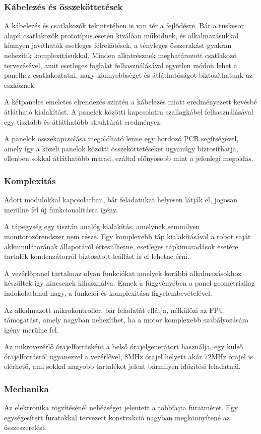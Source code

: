 \subsubsection{Kábelezés és összeköttetések}

A kábelezés és csatlakozók tekintetében is van tér a fejlődésre. Bár a tüskesor
alapú csatlakozók prototípus esetén kiválóan működnek, és alkalmazásukkal könnyen
javíthatók esetleges félrekötések, a tényleges összerakást gyakran nehezítik
komplexitásukkal. Minden alkatrésznek meghatározott csatlakozó tervezésével, amit
esetleges foglalat felhasználásával egyetlen módon lehet a panelhez
csatlakoztatni, nagy könnyebbséget és átláthatóságot biztosíthatunk az eszköznek.

\medskip

A kétpaneles emeletes elrendezés szintén a kábelezés miatt eredményezett kevésbé
átlátható kialakítást. A panelek közötti kapcsolatra szallagkábel
felhasználásával egy tisztább és átláthatóbb struktúrát eredményez.

\medskip

A panelok összekapcsolása megoldható lenne egy hordozó PCB
segítségével, amely így a közeli panelok közötti összeköttetéseket ugyanúgy
biztosíthatja, ellenben sokkal átláthatóbb marad, ezáltal előnyösebb mint a
jelenlegi megoldás.

\subsubsection{Komplexitás}

Adott modulokkal kapcsolatban, bár feladatukat helyesen látják el, jogosan
merülne fel új funkcionalitásra igény.

\medskip

A tápegység egy tisztán analóg kialakítás, amelynek semmilyen monitorozórendszer
nem része. Egy komplexebb táp kialakításával a robot saját akkumulátorának
állapotáról értesülhetne, esetleges tápkimaradások esetére tartalék
kondenzátorról biztosított leállást is el lehetne érni. 

\medskip

A vezérlőpanel tartalmaz olyan funkciókat amelyek korábbi alkalmazásokhoz
készültek így nincsenek kihasználva. Ennek a függvényében a panel geometriailag
indokolatlanul nagy, a funkciói és komplexitása figyelembevételével.

Az alkalmazott mikrokontroller, bár feladatát ellátja, nélkülözi az FPU
támogatást, amely nagyban nehezíthet, ha a motor komplexebb szabályozására igény
merülne fel.

Az mikrovezérlő órajelforrásként a belső órajelgenerátort használja, egy külső
órajelforrásról ugyanezzel a vezérlővel, 8MHz órajel helyett akár 72MHz órajel is
elérhető, ami sokkal nagyobb tartalékot jelent bármilyen időzítési feladatnál.

\subsubsection{Mechanika}

Az elektronika rögzítésénél nehézséget jelentett a többfajta furatméret. Egy
egységesített furatokkal tervezett konstrukció nagyban megkönnyítené az
összeszerelést.
